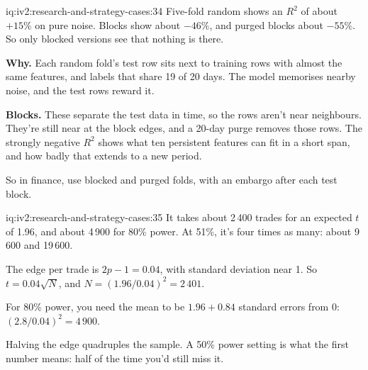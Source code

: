 \begin{solution}{iq:iv2:research-and-strategy-cases:34}
Five-fold random shows an $R^2$ of about $+15\%$ on pure noise. Blocks show about $-46\%$, and purged blocks about $-55\%$. So only blocked versions see that nothing is there.

\textbf{Why.} Each random fold's test row sits next to training rows with almost the same features, and labels that share 19 of 20 days. The model memorises nearby noise, and the test rows reward it.

\textbf{Blocks.} These separate the test data in time, so the rows aren't near neighbours. They're still near at the block edges, and a 20-day purge removes those rows. The strongly negative $R^2$ shows what ten persistent features can fit in a short span, and how badly that extends to a new period.

So in finance, use blocked and purged folds, with an embargo after each test block.

\end{solution}

\begin{solution}{iq:iv2:research-and-strategy-cases:35}
It takes about 2\,400 trades for an expected $t$ of 1.96, and about 4\,900 for 80\% power. At 51\%, it's four times as many: about 9\,600 and 19\,600.

The edge per trade is $2p - 1 = 0.04$, with standard deviation near 1. So $t = 0.04\sqrt{N}$, and $N = (1.96/0.04)^2 = 2\,401$.

For 80\% power, you need the mean to be $1.96 + 0.84$ standard errors from 0: $(2.8/0.04)^2 = 4\,900$.

Halving the edge quadruples the sample. A 50\% power setting is what the first number means: half of the time you'd still miss it.

\end{solution}

